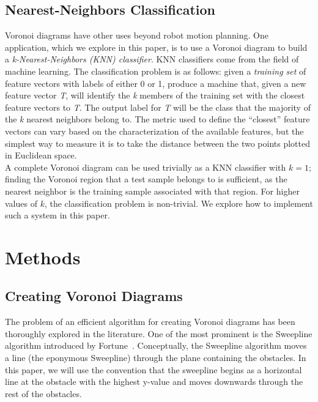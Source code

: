 \documentclass[conference]{IEEEtran}
\begin{document}
\subsection{Nearest-Neighbors Classification}
Voronoi diagrams have other uses beyond robot motion planning.
One application, which we explore in this paper, is to use a Voronoi diagram
to build a \emph{k-Nearest-Neighbors (KNN) classifier}. KNN classifiers come from
the field of machine learning. The classification problem is as follows:
given a \emph{training set} of feature vectors with labels of either 0 or 1,
produce a machine that, given a new feature vector \emph{T}, will identify the \emph{k}
members of the training set with the closest feature vectors to \emph{T}. The
output label for \emph{T} will be the class that the majority of the \emph{k} nearest
neighbors belong to. The metric used to define the ``closest'' feature
vectors can vary based on the characterization of the available features,
but the simplest way to measure it is to take the distance between the
two points plotted in Euclidean space.\\
\indent A complete Voronoi diagram can be used trivially as a KNN classifier with
$k=1$; finding the Voronoi region that a test sample belongs to is sufficient,
as the nearest neighbor is the training sample associated with that region. For
higher values of $k$, the classification problem is non-trivial. We explore how
to implement such a system in this paper.

\section{Methods}
\subsection{Creating Voronoi Diagrams}
The problem of an efficient algorithm for creating Voronoi diagrams has been
thoroughly explored in the literature. One of the most prominent is the Sweepline
algorithm introduced by Fortune~\cite{fortune1987sweepline}. Conceptually,
the Sweepline algorithm moves a line (the eponymous Sweepline) through the plane
containing the obstacles. In this paper, we will use the convention that the
sweepline begins as a horizontal line at the obstacle with the highest y-value
and moves downwards through the rest of the obstacles.
\end{document}

